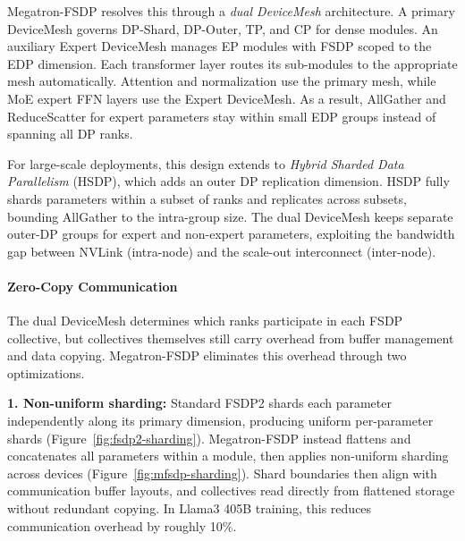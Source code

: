 \documentclass[10pt,logo,copyright]{nvidiatechreport}
\begin{document}
Megatron-FSDP resolves this through a \emph{dual DeviceMesh} architecture. A primary DeviceMesh governs DP-Shard, DP-Outer, TP, and CP for dense modules. An auxiliary Expert DeviceMesh manages EP modules with FSDP scoped to the EDP dimension. Each transformer layer routes its sub-modules to the appropriate mesh automatically. Attention and normalization use the primary mesh, while MoE expert FFN layers use the Expert DeviceMesh. As a result, AllGather and ReduceScatter for expert parameters stay within small EDP groups instead of spanning all DP ranks.


For large-scale deployments, this design extends to \emph{Hybrid Sharded Data Parallelism} (HSDP), which adds an outer DP replication dimension. HSDP fully shards parameters within a subset of ranks and replicates across subsets, bounding AllGather to the intra-group size. The dual DeviceMesh keeps separate outer-DP groups for expert and non-expert parameters, exploiting the bandwidth gap between NVLink (intra-node) and the scale-out interconnect (inter-node).

\paragraph{Zero-Copy Communication}

The dual DeviceMesh determines which ranks participate in each FSDP collective, but collectives themselves still carry overhead from buffer management and data copying. Megatron-FSDP eliminates this overhead through two optimizations.

\textbf{1. Non-uniform sharding:} Standard FSDP2 shards each parameter independently along its primary dimension, producing uniform per-parameter shards (Figure~\ref{fig:fsdp2-sharding}). Megatron-FSDP instead flattens and concatenates all parameters within a module, then applies non-uniform sharding across devices (Figure~\ref{fig:mfsdp-sharding}). Shard boundaries then align with communication buffer layouts, and collectives read directly from flattened storage without redundant copying. In Llama3 405B training, this reduces communication overhead by roughly 10\%.
\end{document}
